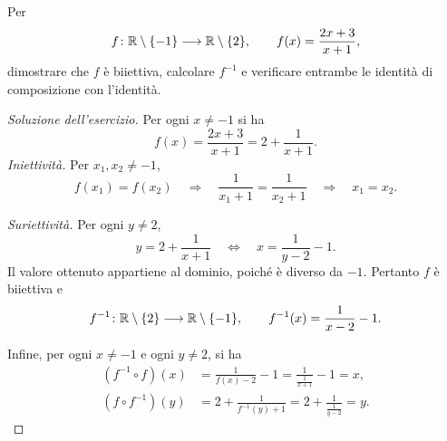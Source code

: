 \begin{exercise}
\label{ex:fondamenti-inversa-rapporto-razionale}
Per
\[
  f\colon\mathbb{R}\setminus\{-1\}\longrightarrow\mathbb{R}\setminus\{2\},
  \qquad f(x)=\frac{2x+3}{x+1},
\]
dimostrare che $f$ è biiettiva, calcolare $f^{-1}$ e
verificare entrambe le identità di composizione con l'identità.
\end{exercise}
\begin{proof}[Soluzione dell'esercizio]
Per ogni $x\ne-1$ si ha
\[
  f(x)=\frac{2x+3}{x+1}=2+\frac{1}{x+1}.
\]
\emph{Iniettività.} Per $x_1,x_2\ne-1$,
\[
  f(x_1)=f(x_2)
  \quad\Longrightarrow\quad
  \frac1{x_1+1}=\frac1{x_2+1}
  \quad\Longrightarrow\quad x_1=x_2.
\]

\emph{Suriettività.} Per ogni $y\ne2$,
\[
  y=2+\frac1{x+1}
  \quad\Longleftrightarrow\quad
  x=\frac1{y-2}-1.
\]
Il valore ottenuto appartiene al dominio, poiché è diverso da $-1$.
Pertanto $f$ è biiettiva e
\[
  f^{-1}\colon\mathbb{R}\setminus\{2\}\longrightarrow
    \mathbb{R}\setminus\{-1\},
  \qquad f^{-1}(x)=\frac1{x-2}-1.
\]

Infine, per ogni $x\ne-1$ e ogni $y\ne2$, si ha
\[
\begin{aligned}
  (f^{-1}\circ f)(x)
    &=\frac1{f(x)-2}-1
     =\frac1{\frac1{x+1}}-1=x,\\
  (f\circ f^{-1})(y)
    &=2+\frac1{f^{-1}(y)+1}
     =2+\frac1{\frac1{y-2}}=y.
\end{aligned}
\]
\end{proof}
